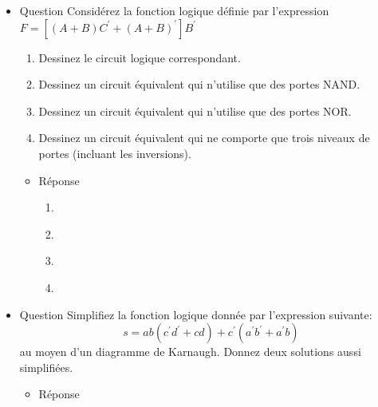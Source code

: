 \documentclass[letter, oneside]{book}
\begin{document}
\begin{itemize}
\item Question
\label{sec:orgcc4894a}
Considérez la fonction logique définie par l'expression 
\(F = [ (A + B) C^{\prime} + (A+B)^{\prime} ] B^{\prime}\)

\begin{enumerate}
\item Dessinez le circuit logique correspondant.

\item Dessinez un circuit équivalent qui n'utilise que des portes
NAND.

\item Dessinez un circuit équivalent qui n'utilise que des portes
NOR.

\item Dessinez un circuit équivalent qui ne comporte que trois niveaux de
portes (incluant les inversions).
\end{enumerate}

\begin{itemize}
\item Réponse
\label{sec:orgcfabe3c}
\begin{enumerate}
\item \begin{center}

\end{center}
\item \begin{center}

\end{center}
\item \begin{center}

\end{center}
\item \begin{center}

\end{center}
\end{enumerate}
\end{itemize}

\item Question
\label{sec:orga22b88b}
Simplifiez la fonction logique donnée par l'expression suivante:
$$
s = a b ( c^{\prime} d^{\prime} + c d) + c^{\prime}(a^{\prime}
b^{\prime} + a^{\prime} b)
$$
au moyen d'un diagramme de Karnaugh. Donnez deux solutions aussi simplifiées.

\begin{itemize}
\item Réponse
\label{sec:org95c7c28}


\end{itemize}
\end{itemize}
\end{document}
